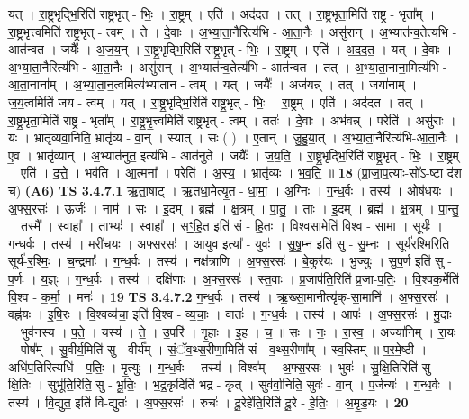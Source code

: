\documentclass[17pt]{extarticle}
\begin{document}
                  यत् । रा॒ष्ट्र॒भृद्भि॒रिति॑ राष्ट्र॒भृत् - भिः॒ । रा॒ष्ट्रम् । एति॑ । अद॑दत । तत् । रा॒ष्ट्र॒भृता॒मिति॑ राष्ट्र - भृता᳚म् । रा॒ष्ट्र॒भृ॒त्त्वमिति॑ राष्ट्रभृत् - त्वम् । ते । दे॒वाः । अ॒भ्या॒ता॒नैरित्य॑भि - आ॒ता॒नैः । असु॑रान् । अ॒भ्यात॑न्व॒तेत्य॑भि - आत॑न्वत । जयैः᳚ । अ॒ज॒य॒न् । रा॒ष्ट्र॒भृद्भि॒रिति॑ राष्ट्र॒भृत् - भिः॒ । रा॒ष्ट्रम् । एति॑ । अ॒द॒द॒त॒ । यत् । दे॒वाः । अ॒भ्या॒ता॒नैरित्य॑भि - आ॒ता॒नैः । असु॑रान् । अ॒भ्यात॑न्व॒तेत्य॑भि - आत॑न्वत । तत् । अ॒भ्या॒ता॒नाना॒मित्य॑भि - आ॒ता॒नाना᳚म् । अ॒भ्या॒ता॒न॒त्वमित्य॑भ्यातान - त्वम् । यत् । जयैः᳚ । अज॑यन्न् । तत् । जया॑नाम् । ज॒य॒त्वमिति॑ जय - त्वम् । यत् । रा॒ष्ट्र॒भृद्भि॒रिति॑ राष्ट्र॒भृत् - भिः॒ । रा॒ष्ट्रम् । एति॑ । अद॑दत । तत् । रा॒ष्ट्र॒भृता॒मिति॑ राष्ट्र - भृता᳚म् । रा॒ष्ट्र॒भृ॒त्त्वमिति॑ राष्ट्रभृत् - त्वम् । ततः॑ । दे॒वाः । अभ॑वन्न् । परेति॑ । असु॑राः । यः । भ्रातृ॑व्यवा॒निति॒ भ्रातृ॑व्य - वा॒न् । स्यात् । सः ( ) । ए॒तान् । जु॒हु॒या॒त् । अ॒भ्या॒ता॒नैरित्य॑भि-आ॒ता॒नैः । ए॒व । भ्रातृ॑व्यान् । अ॒भ्यात॑नुत॒ इत्य॑भि - आत॑नुते । जयैः᳚ । ज॒य॒ति॒ । रा॒ष्ट्र॒भृद्भि॒रिति॑ राष्ट्र॒भृत् - भिः॒ । रा॒ष्ट्रम् । एति॑ । द॒त्ते॒ । भव॑ति । आ॒त्मना᳚ । परेति॑ । अ॒स्य॒ । भ्रातृ॑व्यः । भ॒व॒ति॒ ॥ \textbf{  18 } \newline
                  \newline
                      (प्रा॒जा॒प॒त्याः-सो᳚ऽ-ष्टा द॑श च)  \textbf{(A6)} \newline \newline
                                \textbf{ TS 3.4.7.1} \newline
                  ऋ॒ता॒षाट् । ऋ॒तधा॒मेत्यृ॒त - धा॒मा॒ । अ॒ग्निः । ग॒न्ध॒र्वः । तस्य॑ । ओष॑धयः । अ॒फ्स॒रसः॑ । ऊर्जः॑ । नाम॑ । सः । इ॒दम् । ब्रह्म॑ । क्ष॒त्रम् । पा॒तु॒ । ताः । इ॒दम् । ब्रह्म॑ । क्ष॒त्रम् । पा॒न्तु॒ । तस्मै᳚ । स्वाहा᳚ । ताभ्यः॑ । स्वाहा᳚ । सꣳ॒॒हि॒त इति॑ सं - हि॒तः । वि॒श्वसा॒मेति॑ वि॒श्व - सा॒मा॒ । सूर्यः॑ । ग॒न्ध॒र्वः । तस्य॑ । मरी॑चयः । अ॒फ्स॒रसः॑ । आ॒युव॒ इत्या᳚ - युवः॑ । सु॒षु॒म्न इति॑ सु - सु॒म्नः । सूर्य॑रश्मि॒रिति॒ सूर्य॑-र॒श्मिः॒ । च॒न्द्रमाः᳚ । ग॒न्ध॒र्वः । तस्य॑ । नक्ष॑त्राणि । अ॒फ्स॒रसः॑ । बे॒कुर॑यः । भु॒ज्युः । सु॒प॒र्ण इति॑ सु - प॒र्णः । य॒ज्ञ्ः । ग॒न्ध॒र्वः । तस्य॑ । दक्षि॑णाः । अ॒फ्स॒रसः॑ । स्त॒वाः । प्र॒जाप॑ति॒रिति॑ प्र॒जा-प॒तिः॒ । वि॒श्वक॒र्मेति॑ वि॒श्व - क॒र्मा॒ । मनः॑ । \textbf{  19} \newline
                  \newline
                                \textbf{ TS 3.4.7.2} \newline
                  ग॒न्ध॒र्वः । तस्य॑ । ऋ॒ख्सा॒मानीत्यृ॑क्-सा॒मानि॑ । अ॒फ्स॒रसः॑ । वह्न॑यः । इ॒षि॒रः । वि॒श्वव्य॑चा॒ इति॑ वि॒श्व - व्य॒चाः॒ । वातः॑ । ग॒न्ध॒र्वः । तस्य॑ । आपः॑ । अ॒फ्स॒रसः॑ । मु॒दाः । भुव॑नस्य । प॒ते॒ । यस्य॑ । ते॒ । उ॒परि॑ । गृ॒हाः । इ॒ह । च॒ ॥ सः । नः॒ । रा॒स्व॒ । अज्या॑निम् । रा॒यः । पोष᳚म् । सु॒वीर्य॒मिति॑ सु - वीर्य᳚म् । सं॒ॅव॒थ्स॒रीणा॒मिति॑ सं - व॒थ्स॒रीणा᳚म् । स्व॒स्तिम् ॥ प॒र॒मे॒ष्ठी । अधि॑प॒तिरित्यधि॑ - प॒तिः॒ । मृ॒त्युः । ग॒न्ध॒र्वः । तस्य॑ । विश्व᳚म् । अ॒फ्स॒रसः॑ । भुवः॑ । सु॒क्षि॒तिरिति॑ सु - क्षि॒तिः । सुभू॑ति॒रिति॒ सु - भू॒तिः॒ । भ॒द्र॒कृदिति॑ भद्र - कृत् । सुव॑र्वा॒निति॒ सुवः॑ - वा॒न् । प॒र्जन्यः॑ । ग॒न्ध॒र्वः । तस्य॑ । वि॒द्युत॒ इति॑ वि-द्युतः॑ । अ॒फ्स॒रसः॑ । रुचः॑ । दू॒रेहे॑ति॒रिति॑ दू॒रे - हे॒तिः॒ । अ॒मृ॒ड॒यः । \textbf{  20} \newline
\end{document}
